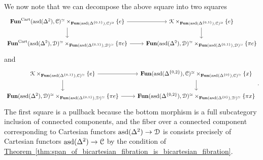 \documentclass[main.tex]{subfiles}
\begin{document}
We now note that we can decompose the above square into two squares
\begin{equation*}
  \begin{tikzcd}
    \Fun^{\Cart}(\asd(\Delta^{2}), \category{C})^{\simeq} \times_{\Fun(\asd(\Delta^{\{0, 1\}}), \category{C})^{\simeq}} \{e\}
    \arrow[r]
    \arrow[d]
    & \category{K} \times_{\Fun(\asd(\Delta^{\{0, 1\}}), \category{C})^{\simeq}} \{e\}
    \arrow[d]
    \\
    \Fun^{\Cart}(\asd(\Delta^{2}), \category{D})^{\simeq} \times_{\Fun(\asd(\Delta^{\{0, 1\}}), \category{D})^{\simeq}} \{\pi e\}
    \arrow[r]
    & \Fun(\asd(\Delta^{2}), \category{D})^{\simeq} \times_{\Fun(\asd(\Delta^{\{0, 1\}}), \category{D})^{\simeq}} \{\pi e\}
  \end{tikzcd}
\end{equation*}
and
\begin{equation*}
  \begin{tikzcd}
    \category{K} \times_{\Fun(\asd(\Delta^{\{0, 1\}}), \category{C})^{\simeq}} \{e\}
    \arrow[r]
    \arrow[d]
    & \Fun(\asd(\Delta^{\{0, 2\}}), \category{C})^{\simeq} \times_{\Fun(\asd(\Delta^{\{0\}}), \category{C})^{\simeq}} \{x\}
    \arrow[d]
    \\
    \Fun(\asd(\Delta^{2}), \category{D})^{\simeq} \times_{\Fun(\asd(\Delta^{\{0, 1\}}), \category{D})^{\simeq}} \{\pi e\}
    \arrow[r]
    & \Fun(\asd(\Delta^{\{0, 2\}}), \category{D})^{\simeq} \times_{\Fun(\asd(\Delta^{\{0\}}), \category{D})^{\simeq}} \{\pi x\}
  \end{tikzcd}.
\end{equation*}
The first square is a pullback because the bottom morphism is a full subcategory inclusion of connected components, and the fiber over a connected component corresponding to Cartesian functors $\mathrm{asd}(\Delta^{2}) \to \mathcal{D}$ is consists precisely of Cartesian functors $\mathrm{asd}(\Delta^{2}) \to \mathcal{C}$ by the condition of \hyperref[thm:span_of_bicartesian_fibration_is_bicartesian_fibration]{Theorem~\ref*{thm:span_of_bicartesian_fibration_is_bicartesian_fibration}}.
\end{document}
